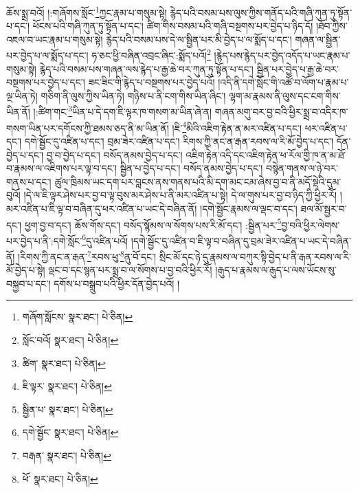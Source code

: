 ཆོས་སྨྲ་བའོ། །:གཞོགས་སློང་\footnote{གཞོག་སློངས་  སྣར་ཐང་།  པེ་ཅིན། }ཀྱང་རྣམ་པ་གསུམ་སྟེ། རྙེད་པའི་བསམ་པས་ལུས་ཀྱིས་གནོད་པའི་གཞི་ཀུན་ཏུ་སྟོན་པ་དང་། ཕོངས་པའི་གཞི་ཀུན་ཏུ་སྟོན་པ་དང་། ཚིག་གིས་བསམ་པའི་གཞི་བསྔགས་པར་བྱེད་པ་ཉིད་དོ། །ཐོབ་ཀྱིས་འཇལ་བ་ཡང་རྣམ་པ་གསུམ་སྟེ། རྙེད་པའི་བསམ་པས་དེ་ལ་སྦྱིན་པར་མི་བྱེད་པ་ལ་སྨོད་པ་དང་། གཞན་ལ་སྦྱིན་པར་བྱེད་པ་ལ་སྨོད་པ་དང་། ཧ་ཅང་ཕྱི་བཞིན་འབྲང་ཞིང་:སྨོད་པའོ།\footnote{སློང་བའོ།  སྣར་ཐང་།  པེ་ཅིན། } །རྙེད་པས་རྙེད་པར་བྱེད་འདོད་པ་ཡང་རྣམ་པ་གསུམ་སྟེ། རྙེད་པའི་བསམ་པས་གཞན་ལས་རྙེད་པ་རྒྱ་ཆེ་བར་ཀུན་ཏུ་སྟོན་པ་དང་། སྦྱིན་པར་བྱེད་པ་རྒྱ་ཆེ་བར་བསྔགས་པར་བྱེད་པ་དང་། ཟང་ཟིང་གི་རྙེད་པ་བསྔགས་པར་བྱེད་པའོ། །འདི་ནི་དགེ་སློང་གི་འཚོ་བ་ལོག་པ་རྣམ་པ་ལྔ་ཡིན་ཏེ། གཅིག་ནི་ལུས་ཀྱིས་ཡིན་ཏེ། གཉིས་པ་ནི་ངག་གིས་ཡིན་ཞིང་། ལྷག་མ་རྣམས་ནི་ལུས་དང་ངག་གིས་ཡིན་ནོ། །:ཚིག་གང་\footnote{ཚིག་  སྣར་ཐང་།  པེ་ཅིན། }ཡིན་པ་དེ་དག་ཇི་ལྟར་ཁ་གསག་མ་ཡིན་ཞེ་ན། གཞན་མགུ་བར་བྱ་བའི་ཕྱིར་སྨྲ་བ་འདིར་ཁ་གསག་ཡིན་པར་དགོངས་ཀྱི་ཐམས་ཅད་ནི་མ་ཡིན་ནོ། །ཇི་\footnote{ཇི་ལྟར་  སྣར་ཐང་།  པེ་ཅིན། }མིའི་འཇིག་རྟེན་ན་མར་འཛིན་པ་དང་། ཕར་འཛིན་པ་དང་། དགེ་སྦྱོང་དུ་འཛིན་པ་དང་། བྲམ་ཟེར་འཛིན་པ་དང་། རིགས་ཀྱི་ནང་ན་རྒན་རབས་ལ་རི་མོ་བྱེད་པ་དང་། དོན་བྱེད་པ་དང་། བྱ་བ་བྱེད་པ་དང་། བསོད་ནམས་བྱེད་པ་དང་། འཇིག་རྟེན་འདི་དང་འཇིག་རྟེན་ཕ་རོལ་གྱི་ཁ་ན་མ་ཐོ་བ་རྣམས་ལ་འཇིགས་པར་ལྟ་བ་དང་། སྦྱིན་པ་བྱེད་པ་དང་། བསོད་ནམས་བྱེད་པ་དང་། བསྙེན་གནས་ལ་ཉེ་བར་གནས་པ་དང་། ཚུལ་ཁྲིམས་ཡང་དག་པར་བླངས་ནས་གནས་པའི་མི་དག་མང་ངམ་ཞེས་བྱ་བ་ནི་མདོ་སྡེའི་དུམ་བུའོ། །དེ་ལ་ཇི་ལྟར་ཤེས་པར་བྱ་བ་ལྟ་བུས་མར་ཤེས་པ་ནི་མར་འཛིན་པ་སྟེ། དེ་ལ་གུས་པར་བྱ་བ་ཉིད་ཀྱི་ཕྱིར་རོ། །མར་འཛིན་པ་ཇི་ལྟ་བ་བཞིན་དུ་ཕར་འཛིན་པ་ཡང་དེ་བཞིན་ནོ། །དགེ་སྦྱོང་རྣམས་ལ་ལྡང་བ་དང་། ཐལ་མོ་སྦྱར་བ་དང་། ཕྱག་བྱ་བ་དང་། ཆོས་གོས་དང་། བསོད་སྙོམས་ལ་སོགས་པས་རི་མོ་དང་། :སྦྱིན་པར་\footnote{སྦྱིན་པ་  སྣར་ཐང་།  པེ་ཅིན། }བྱ་བའི་ཕྱིར་ལེགས་པར་བྱེད་པ་ནི་:དགེ་སློང་\footnote{དགེ་སྦྱོང་  སྣར་ཐང་།  པེ་ཅིན། }དུ་འཛིན་པའོ། །དགེ་སྦྱོང་དུ་འཛིན་བ་ཇི་ལྟ་བ་བཞིན་དུ་བྲམ་ཟེར་འཛིན་པ་ཡང་དེ་བཞིན་ནོ། །རིགས་ཀྱི་ནང་ན་རྒན་\footnote{བརྒན་  སྣར་ཐང་།  པེ་ཅིན། }རབས་ཕུ་\footnote{ཕོ་  སྣར་ཐང་།  པེ་ཅིན། }ནུ་བོ་དང་། སྲིང་མོ་དང་ཉེ་དུ་རྣམས་ལ་བཀུར་སྟི་བྱེད་པ་ནི་རྒན་རབས་ལ་རི་མོ་བྱེད་པ་སྟེ། ལྡང་བ་དང་སྙན་པར་སྨྲ་བ་ལ་སོགས་པ་བྱ་བའི་ཕྱིར་རོ། །རྒུད་པ་རྣམས་ལ་རྒུད་པ་ལས་ཡོངས་སུ་བསྐྱབ་པ་དང་། དགོས་པ་བསྒྲུབ་པའི་ཕྱིར་དོན་བྱེད་པའོ། །

